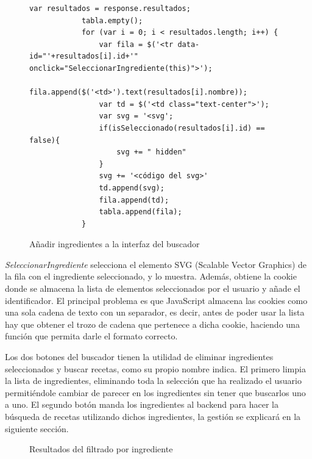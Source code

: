 \begin{figure}[H]
    \begin{lstlisting}[style=consola]
         var resultados = response.resultados;
            tabla.empty();
            for (var i = 0; i < resultados.length; i++) {
                var fila = $('<tr data-id="'+resultados[i].id+'" onclick="SeleccionarIngrediente(this)">');
                fila.append($('<td>').text(resultados[i].nombre));
                var td = $('<td class="text-center">');
                var svg = '<svg';
                if(isSeleccionado(resultados[i].id) == false){
                    svg += " hidden"
                }
                svg += '<código del svg>'
                td.append(svg);
                fila.append(td);
                tabla.append(fila);
            }
\end{lstlisting}
\caption{Añadir ingredientes a la interfaz del buscador}
\label{sni:JSBuscar}
\end{figure}

\textit{SeleccionarIngrediente} selecciona el elemento \gls{SVG} (Scalable Vector Graphics) de la fila con el ingrediente seleccionado, y lo muestra. Además, obtiene la \gls{cookie} donde se almacena la lista de elementos seleccionados por el usuario y añade el identificador. El principal problema es que JavaScript almacena las \glspl{cookie} como una sola cadena de texto con un separador, es decir, antes de poder usar la lista hay que obtener el trozo de cadena que pertenece a dicha \gls{cookie}, haciendo una función que permita darle el formato correcto.

Los dos botones del buscador tienen la utilidad de eliminar ingredientes seleccionados y buscar recetas, como su propio nombre indica. El primero limpia la lista de ingredientes, eliminando toda la selección que ha realizado el usuario permitiéndole cambiar de parecer en los ingredientes sin tener que buscarlos uno a uno. El segundo botón manda los ingredientes al \gls{backend} para hacer la búsqueda de recetas utilizando dichos ingredientes, la gestión se explicará en la siguiente sección.

\begin{figure}[h!]
\centering
{}
\caption{Resultados del filtrado por ingrediente}
\label{fig:resultados}
\end{figure}


